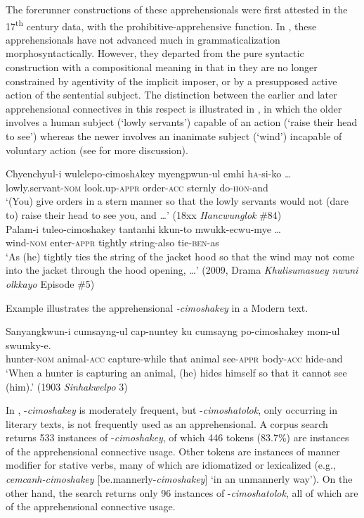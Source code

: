 \documentclass[output=paper,colorlinks,citecolor=brown]{langscibook}
\begin{document}
The forerunner constructions of these apprehensionals were first attested in the 17\textsuperscript{th} century data, with the prohibitive-apprehensive function. In , these apprehensionals have not advanced much in grammaticalization morphosyntactically. However, they departed from the pure syntactic construction with a com\-positional meaning in that in  they are no longer constrained by agentivity of the implicit imposer, or by a presupposed active action of the sentential subject. The distinction between the earlier and later apprehensional connectives in this respect is illustrated in , in which the older  involves a human subject (`lowly servants') capable of an action (`raise their head to see') whereas the newer  involves an inanimate subject (`wind') incapable of voluntary action (see  for more discussion).


\ea \label{ex:RK13}
\ea \label{ex:RK13a}
\gll Chyenchyul-i wulelepo-cimosh\textsc{a}key myengpwun-ul emhi h\textsc{a}-si-ko …\\
lowly.servant-\textsc{nom} look.up-\textsc{appr} order-\textsc{acc} sternly do-\textsc{hon}-and \\
\glt `(You) give orders in a stern manner so that the lowly servants would not (dare to) raise their head to see you, and …' (18xx \textit{Hancwunglok} \#84)\\
\ex \label{ex:RK13b}
\gll Palam-i tuleo-cimoshakey tantanhi kkun-to mwukk-ecwu-mye …\\
wind-\textsc{nom} enter-\textsc{appr} tightly string-also tie-\textsc{ben}-as\\
\glt `As (he) tightly ties the string of the jacket hood so that the wind may not come into the jacket through the hood opening,  …' (2009, Drama \textit{Khulisumasuey nwuni olkkayo} Episode \#5)
\z
\z

 Example  illustrates the apprehensional \textit{-cimoshakey} in a Modern  text.


\ea \label{ex:RK14}
\gll Sanyangkwun-i cumsayng-ul cap-nuntey ku cumsayng po-cimoshakey mom-ul swumky-e. \\
hunter-\textsc{nom} animal-\textsc{acc} capture-while that animal see-\textsc{appr} body-\textsc{acc} hide-and \\
\glt `When a hunter is capturing an animal, (he) hides himself so that it cannot see (him).' (1903 \textit{Sinhakwelpo} 3)
\z

 In , \nobreakdash-\textit{cimoshakey} is moderately frequent, but \nobreakdash-\textit{cimoshatolok}, only occurring in literary texts, is not frequently used as an apprehensional. A corpus search returns 533 instances of \nobreakdash-\textit{cimoshakey}, of which 446 tokens (83.7\%) are instances of the apprehensional connective usage. Other tokens are instances of manner modifier for stative verbs, many of which are idiomatized or lexicalized (e.g., \textit{cemcanh-cimoshakey} [be.mannerly-\textit{cimoshakey}] `in an unmannerly way'). On the other hand, the search returns only 96 instances of \nobreakdash-\textit{cimoshatolok}, all of which are of the apprehensional connective usage.
\end{document}
